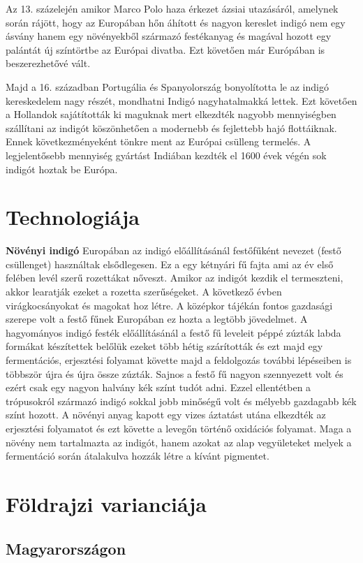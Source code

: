 \documentclass[fontsize=12pt, appendixprefix=true]{scrreprt}
\begin{document}
Az 13. százelején amikor Marco Polo haza érkezet ázsiai utazásáról, amelynek során rájött, hogy az Europában hőn áhított és nagyon kereslet indigó nem egy ásvány hanem egy növényekből származó festékanyag és magával hozott egy palántát új színtörtbe az Európai divatba. Ezt követően már Európában is beszerezhetővé vált.

Majd a 16. században Portugália és Spanyolország bonyolította le az indigó kereskedelem nagy részét, mondhatni Indigó nagyhatalmakká lettek.
Ezt követően a Hollandok sajátították ki maguknak mert elkezdték nagyobb mennyiségben szállítani az indigót köszönhetően a modernebb és fejlettebb hajó flottáiknak. Ennek következményeként tönkre ment az Európai csülleng termelés. A legjelentősebb mennyiség gyártást Indiában kezdték el 1600 évek végén sok indigót hoztak be Európa.
 
\section{Technologiája}
 \textbf{Növényi indigó}
 Europában az indigó előállításánál festőfűként nevezet (festő csüllenget) használtak elsődlegesen. Ez a egy kétnyári fű fajta ami az év első felében levél szerű rozettákat nőveszt.
 Amikor az indigót kezdik el termeszteni, akkor learatják ezeket a rozetta szerűségeket. A következő évben virágkocsányokat és magokat hoz létre.
 A középkor tájékán fontos gazdasági szerepe volt a festő fűnek Europában ez hozta a legtöbb jövedelmet.  
 A hagyományos indigó festék előállításánál a festő fű leveleit péppé zúzták labda formákat készítettek belőlük ezeket több hétig szárították és ezt majd egy fermentációs, erjesztési folyamat követte majd a feldolgozás további lépéseiben is többször újra és újra össze zúzták.
 Sajnos a festő fű nagyon szennyezett volt és ezért csak egy nagyon halvány kék színt tudót adni.
 Ezzel ellentétben a trópusokról származó indigó sokkal jobb minőségű volt és mélyebb gazdagabb kék színt hozott.
 A növényi anyag kapott egy vizes áztatást utána elkezdték az erjesztési folyamatot és ezt követte a levegőn történő oxidációs folyamat. Maga a növény nem tartalmazta az indigót, hanem azokat az alap vegyületeket melyek a fermentáció során átalakulva hozzák létre a kívánt pigmentet.

\section{Földrajzi varianciája}

\subsection{Magyarországon}
\end{document}
